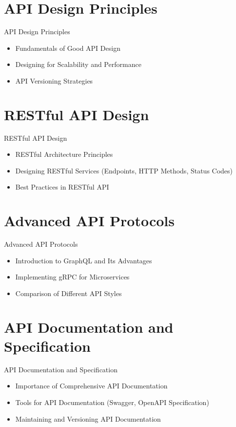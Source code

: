 \documentclass{beamer}
\begin{document}
 
\section{API Design Principles}
\begin{frame}{API Design Principles}
  \begin{itemize}
    \item Fundamentals of Good API Design
    \item Designing for Scalability and Performance
    \item API Versioning Strategies
  \end{itemize}
\end{frame}

\section{RESTful API Design}
\begin{frame}{RESTful API Design}
  \begin{itemize}
    \item RESTful Architecture Principles
    \item Designing RESTful Services (Endpoints, HTTP Methods, Status Codes)
    \item Best Practices in RESTful API
  \end{itemize}
\end{frame}



\section{Advanced API Protocols}
\begin{frame}{Advanced API Protocols}
  \begin{itemize}
    \item Introduction to GraphQL and Its Advantages
    \item Implementing gRPC for Microservices
    \item Comparison of Different API Styles
  \end{itemize}
\end{frame}

\section{API Documentation and Specification}
\begin{frame}{API Documentation and Specification}
  \begin{itemize}
    \item Importance of Comprehensive API Documentation
    \item Tools for API Documentation (Swagger, OpenAPI Specification)
    \item Maintaining and Versioning API Documentation
  \end{itemize}
\end{frame}
\end{document}
